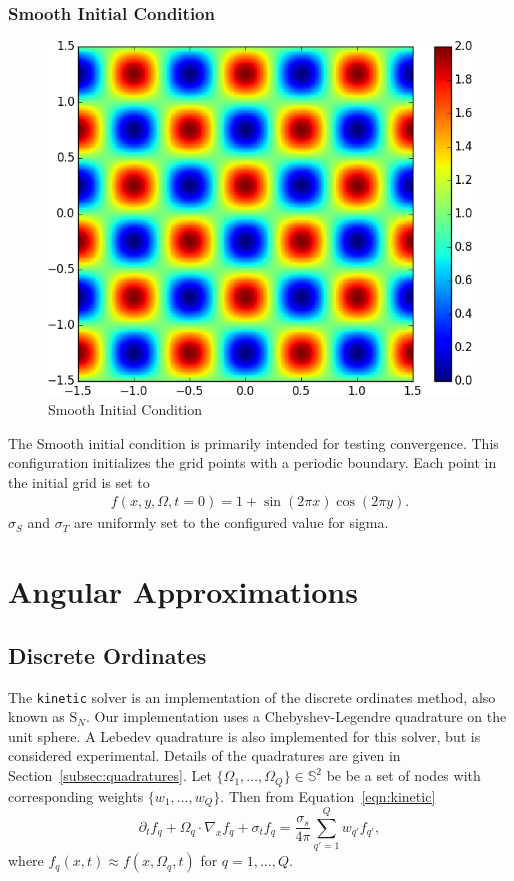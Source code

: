 \documentclass{article}
\newcommand{\twosphere}{\ensuremath{\mathbb{S}^2}\xspace}
\newcommand{\kinetic}{\texttt{kinetic}\xspace}
\begin{document}
\subsubsection{Smooth Initial Condition}
\begin{figure}
    \centering
    \includegraphics[height=0.3\textheight]{initcond_smooth.png}
    \caption{Smooth Initial Condition}
    \label{fig:smooth_ic}
\end{figure}
The Smooth initial condition is primarily intended for testing convergence.
This configuration initializes the grid points with a periodic boundary.
Each point in the initial grid is set to
\begin{align}
f(x,y,\Omega,t=0) = 1 + \sin(2\pi x)\cos(2\pi y).
\end{align}
$\sigma_S$ and $\sigma_T$ are uniformly set to the configured
value for sigma.


\section{Angular Approximations}
\subsection{Discrete Ordinates}
The \kinetic solver is an implementation of the discrete ordinates method, also known
as $\mathrm{S}_N$.
Our implementation uses a Chebyshev-Legendre quadrature on the unit sphere.
A Lebedev quadrature is also implemented for this solver,
but is considered experimental.
Details of the quadratures are given in Section~\ref{subsec:quadratures}. Let
$\{\Omega_1, \dots, \Omega_Q\} \in \twosphere$ be be a set of nodes with
corresponding weights $\{w_1, \dots, w_Q\}$. Then from Equation~\ref{eqn:kinetic}
\begin{equation}
    \partial_t f_q + \Omega_q \cdot \nabla_x f_q + \sigma_t f_q=
    \frac{\sigma_s}{4\pi} \sum_{q'=1}^Q w_{q'} f_{q'},
\end{equation}
where $f_q(x,t) \approx f(x, \Omega_q, t)$ for $q = 1, \dots, Q$.
\end{document}

